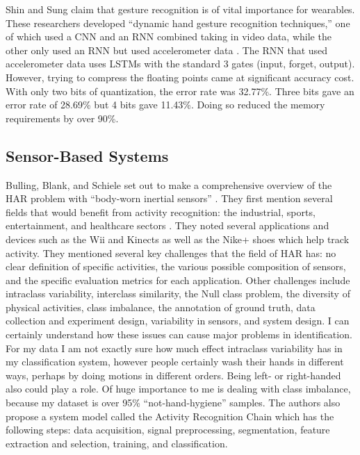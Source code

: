 \documentclass[]{report}
\begin{document}
Shin and Sung claim that gesture recognition is of vital importance for wearables. These researchers developed “dynamic hand gesture recognition techniques,” one of which used a CNN and an RNN combined taking in video data, while the other only used an RNN but used accelerometer data \cite{ShinS16}. The RNN that used accelerometer data uses LSTMs with the standard 3 gates (input, forget, output). However, trying to compress the floating points came at significant accuracy cost. With only two bits of quantization, the error rate was 32.77\%. Three bits gave an error rate of 28.69\% but 4 bits gave 11.43\%. Doing so reduced the memory requirements by over 90\%. 

\subsection{Sensor-Based Systems}

Bulling, Blank, and Schiele set out to make a comprehensive overview of the HAR problem with “body-worn inertial sensors” \cite{Bulling}. They first mention several fields that would benefit from activity recognition: the industrial, sports, entertainment, and healthcare sectors \cite{Bulling}. They noted several applications and devices such as the Wii and Kinects as well as the Nike+ shoes which help track activity. They mentioned several key challenges that the field of HAR has: no clear definition of specific activities, the various possible composition of sensors, and the specific evaluation metrics for each application. Other challenges include intraclass variability, interclass similarity, the Null class problem, the diversity of physical activities, class imbalance, the annotation of ground truth, data collection and experiment design, variability in sensors, and system design. I can certainly understand how these issues can cause major problems in identification. For my data I am not exactly sure how much effect intraclass variability has in my classification system, however people certainly wash their hands in different ways, perhaps by doing motions in different orders. Being left- or right-handed also could play a role. Of huge importance to me is dealing with class imbalance, because my dataset is over 95\% “not-hand-hygiene” samples. The authors also propose a system model called the Activity Recognition Chain which has the following steps: data acquisition, signal preprocessing, segmentation, feature extraction and selection, training, and classification. 
\end{document}
